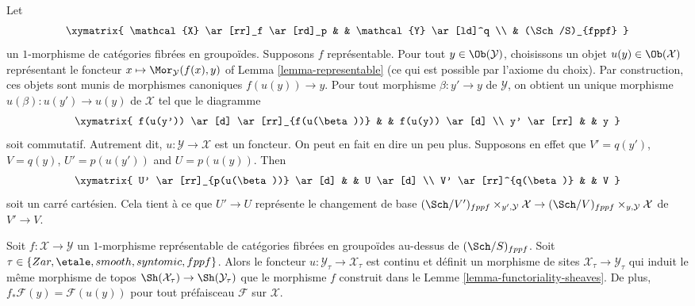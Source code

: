 \noindent
Let
$$
\xymatrix{
\mathcal{X} \ar[rr]_f \ar[rd]_p & &  \mathcal{Y} \ar[ld]^q \\
& (\Sch/S)_{fppf}
}
$$
un $1$-morphisme de catégories fibrées en groupoïdes. Supposons $f$
représentable. Pour tout $y \in \Ob(\mathcal{Y})$, choisissons
un objet $u(y) \in \Ob(\mathcal{X})$ représentant le foncteur
$x \mapsto \Mor_\mathcal{Y}(f(x), y)$ of
Lemma \ref{lemma-representable}
(ce qui est possible par l'axiome du choix).
Par construction, ces objets sont munis de morphismes canoniques
$f(u(y)) \to y$.
Pour tout morphisme $\beta : y' \to y$ de $\mathcal{Y}$, on obtient un unique
morphisme $u(\beta) : u(y') \to u(y)$ de $\mathcal{X}$ tel que le diagramme
$$
\xymatrix{
f(u(y')) \ar[d] \ar[rr]_{f(u(\beta))} & & f(u(y)) \ar[d] \\
y' \ar[rr] & & y
}
$$
soit commutatif. Autrement dit, $u : \mathcal{Y} \to \mathcal{X}$ est un foncteur.
On peut en fait en dire un peu plus. Supposons en effet que
$V' = q(y')$, $V = q(y)$, $U' = p(u(y'))$ and $U = p(u(y))$. Then
$$
\xymatrix{
U' \ar[rr]_{p(u(\beta))} \ar[d] & & U \ar[d] \\
V' \ar[rr]^{q(\beta)} & & V
}
$$
soit un carré cartésien. Cela tient à ce que $U' \to U$ représente
le changement de base
$(\Sch/V')_{fppf} \times_{y', \mathcal{Y}} \mathcal{X} \to
(\Sch/V)_{fppf} \times_{y, \mathcal{Y}} \mathcal{X}$
de $V' \to V$.

\begin{lemma}
\label{lemma-representable-pushforward}
Soit $f : \mathcal{X} \to \mathcal{Y}$ un $1$-morphisme représentable de
catégories fibrées en groupoïdes au-dessus de $(\Sch/S)_{fppf}$. Soit
$\tau \in \{Zar, \etale, smooth, syntomic, fppf\}$.
Alors le foncteur $u : \mathcal{Y}_\tau \to \mathcal{X}_\tau$ est continu
et définit un morphisme de sites $\mathcal{X}_\tau \to \mathcal{Y}_\tau$
qui induit le même morphisme de topos
$\Sh(\mathcal{X}_\tau) \to \Sh(\mathcal{Y}_\tau)$
que le morphisme $f$ construit dans le
Lemme \ref{lemma-functoriality-sheaves}.
De plus, $f_*\mathcal{F}(y) = \mathcal{F}(u(y))$ pour tout préfaisceau
$\mathcal{F}$ sur $\mathcal{X}$.
\end{lemma}

